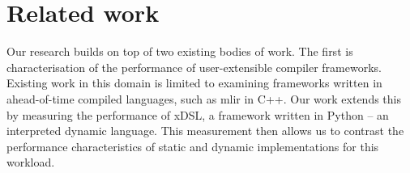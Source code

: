 \chapter{Related work}
\label{chap:related-work}

%
%

Our research builds on top of two existing bodies of work.
The first is characterisation of the performance of user-extensible compiler frameworks. Existing work in this domain is limited to examining frameworks written in ahead-of-time compiled languages, such as \ac{mlir} in C++.
Our work extends this by measuring the performance of xDSL, a framework written in Python -- an interpreted dynamic language. This measurement then allows us to contrast the performance characteristics of static and dynamic implementations for this workload.


